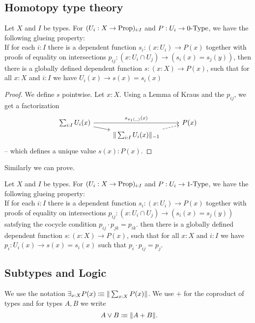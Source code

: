\subsection{Homotopy type theory}

\begin{lemma}%
  \label{kraus-glueing}
  Let $X$ and $I$ be types.
  For $(U_i:X \to \mathrm{Prop})_{i:I}$ and $P:U_i\to 0\mbox{-}\mathrm{Type}$, we have the following glueing property: \\
  If for each $i:I$ there is a dependent function $s_i:(x:U_i)\to P(x)$ together with
  proofs of equality on intersections $p_{ij}:(x:U_i\cap U_j)\to (s_i(x)=s_j(y))$,
  then there is a globally defined dependent function $s:(x:X) \to P(x)$,
  such that for all $x:X$ and $i:I$ we have $U_i(x) \to s(x)=s_i(x)$
\end{lemma}

\begin{proof}
  We define $s$ pointwise.
  Let $x:X$.
  Using a Lemma of Kraus and the $p_{ij}$, we get a factorization
  \[ \begin{tikzcd}[row sep=0mm]
    \sum_{i:I} U_i(x) \ar[rr, "s_{\pi_1(\_)}(x)"]\ar[rd] & & P(x) \\
    & \|\sum_{i:I} U_i(x)\|_{-1}\ar[ru,dashed] &
  \end{tikzcd} \]
-- which defines a unique value $s(x):P(x)$.
\end{proof}

Similarly we can prove.

\begin{lemma}%
  \label{kraus-glueing-1-type}
  Let $X$ and $I$ be types.
  For $(U_i:X \to \mathrm{Prop})_{i:I}$ and $P:U_i\to 1\mbox{-}\mathrm{Type}$, we have the following glueing property: \\
  If for each $i:I$ there is a dependent function $s_i:(x:U_i)\to P(x)$ together with
  proofs of equality on intersections $p_{ij}:(x:U_i\cap U_j)\to (s_i(x)=s_j(y))$ satsfying the cocycle
  condition $p_{ij}\cdot p_{jk} = p_{ik}$.
  then there is a globally defined dependent function $s:(x:X) \to P(x)$,
  such that for all $x:X$ and $i:I$ we have $p_i:U_i(x) \to s(x)=s_i(x)$ such that $p_i\cdot p_{ij} = p_j$.
\end{lemma}



\subsection{Subtypes and Logic}

We use the notation $\exists_{x:X}P(x)\vcentcolon\mspace{-1.2mu}\equiv \|\sum_{x:X}P(x)\|$.
We use $+$ for the coproduct of types and for types $A,B$ we write
\[ A\vee B\colonequiv \| A+B \|\rlap{.}\]

